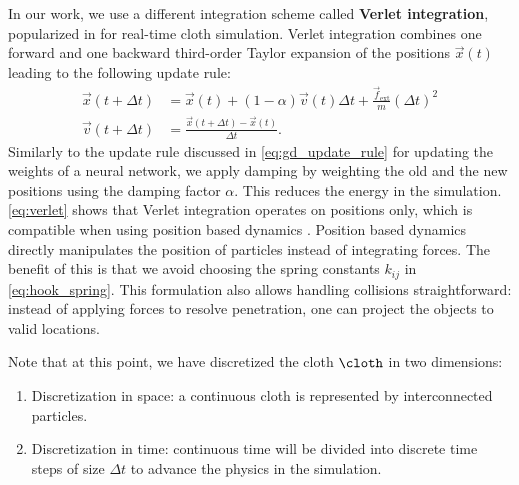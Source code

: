 \documentclass[\home/main.tex]{subfiles}
\begin{document}
In our work, we use a different integration scheme called \textbf{Verlet integration}, popularized in \autocite{Jakobsen2001} for real-time cloth simulation. Verlet integration combines one forward and one backward third-order Taylor expansion of the positions $\vec{x}(t)$ leading to the following update rule:
\begin{equation} \label{eq:verlet}
    \begin{aligned}
        \vec{x}(t + \Delta t) & = \vec{x}(t) + (1 - \alpha) \vec{v}(t) \Delta t + \frac{\vec{f}_{\text{ext}}}{m} {(\Delta t)}^2 \\
        \vec{v}(t+ \Delta t)  & = \frac{\vec{x}(t + \Delta t) - \vec{x}(t)}{\Delta t} .
    \end{aligned}
\end{equation}
Similarly to the update rule discussed in \cref{eq:gd_update_rule} for updating the weights of a neural network, we apply damping by weighting the old and the new positions using the damping factor $\alpha$. This reduces the energy in the simulation.
\cref{eq:verlet} shows that Verlet integration operates on positions only, which is compatible when using position based dynamics \autocite{muller2007position}. Position based dynamics directly manipulates the position of particles instead of integrating forces. The benefit of this is that we avoid choosing the spring constants $k_{ij}$ in \cref{eq:hook_spring}. This formulation also allows handling collisions straightforward: instead of applying forces to resolve penetration, one can project the objects to valid locations.

Note that at this point, we have discretized the cloth $\cloth$ in two dimensions:
\begin{enumerate}
    \item Discretization in space: a continuous cloth is represented by interconnected particles.
    \item Discretization in time: continuous time will be divided into discrete time steps of size $\Delta t$ to advance the physics in the simulation.
\end{enumerate}
\end{document}
